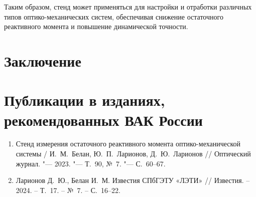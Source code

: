 Таким образом, стенд может применяться для настройки и отработки различных типов оптико-механических систем, обеспечивая снижение остаточного реактивного момента и повышение динамической точности.







\FloatBarrier
{}                                  %
\section*{Заключение}



\section*{Публикации в изданиях, рекомендованных ВАК России}
\begin{enumerate}
\item Стенд измерения остаточного реактивного момента оптико-механической системы / И.~М.~Белан, Ю.~П.~Ларионов, Д.~Ю.~Ларионов // Оптический журнал. "--- 2023. "--- Т.~90, №~7. "--- С.~60--67.

\item Ларионов Д.~Ю., Белан И.~М.  
Известия СПбГЭТУ «ЛЭТИ» // Известия. – 2024. – Т.~17. – №~7. – С.~16--22.




\end{enumerate}

